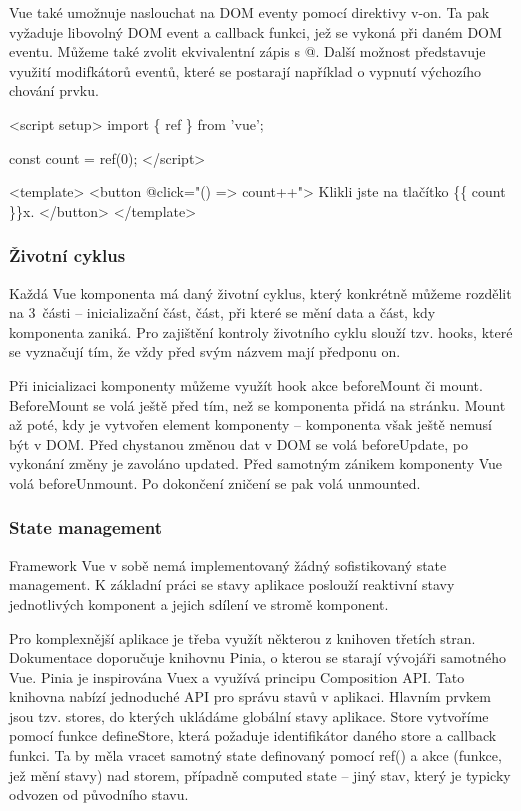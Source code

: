 Vue také umožnuje naslouchat na DOM eventy pomocí direktivy v-on. Ta pak vyžaduje libovolný DOM event a callback funkci, jež se vykoná při daném DOM eventu. 
Můžeme také zvolit ekvivalentní zápis s @. Další možnost představuje využití modifkátorů eventů, které se postarají například o vypnutí výchozího chování prvku.\cite{vuemacrae,vue}

\begin{prog}
<script setup>
  import \{ ref \} from 'vue';

  const count = ref(0);
</script>

<template>
  <button @click="() => count++">
    Klikli jste na tlačítko \{\{ count \}\}x.
  </button>
</template>
\end{prog}

\subsubsection{Životní cyklus}

Každá Vue komponenta má daný životní cyklus, který konkrétně můžeme rozdělit na 3~části -- inicializační část, část, při které se mění data a část, kdy komponenta zaniká. 
Pro zajištění kontroly životního cyklu slouží tzv. hooks, které se vyznačují tím, že vždy před svým názvem mají předponu on.

Při inicializaci komponenty můžeme využít hook akce beforeMount či mount. BeforeMount se volá ještě před tím, než se komponenta přidá na stránku. 
Mount až poté, kdy je vytvořen element komponenty -- komponenta však ještě nemusí být v DOM. 
Před chystanou změnou dat v DOM se volá beforeUpdate, po vykonání změny je zavoláno updated. Před samotným zánikem komponenty Vue volá beforeUnmount. 
Po dokončení zničení se pak volá unmounted.\cite{vuemacrae,vue}

\subsubsection{State management}

Framework Vue v sobě nemá implementovaný žádný sofistikovaný state management. 
K základní práci se stavy aplikace poslouží reaktivní stavy jednotlivých komponent a jejich sdílení ve stromě komponent.

Pro komplexnější aplikace je třeba využít některou z knihoven třetích stran. Dokumentace doporučuje knihovnu Pinia, o kterou se starají vývojáři samotného Vue. 
Pinia je inspirována Vuex a využívá principu Composition API. Tato knihovna nabízí jednoduché API pro správu stavů v aplikaci. 
Hlavním prvkem jsou tzv. stores, do kterých ukládáme globální stavy aplikace. 
Store vytvoříme pomocí funkce defineStore, která požaduje identifikátor daného store a callback funkci. 
Ta by měla vracet samotný state definovaný pomocí ref() a akce (funkce, jež mění stavy) nad storem, případně computed state -- jiný stav, který je typicky odvozen od původního stavu.\cite{pinia,vue}

